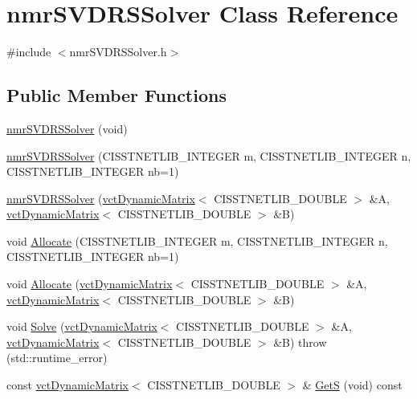\hypertarget{classnmr_s_v_d_r_s_solver}{}\section{nmr\+S\+V\+D\+R\+S\+Solver Class Reference}
\label{classnmr_s_v_d_r_s_solver}


{\ttfamily \#include $<$nmr\+S\+V\+D\+R\+S\+Solver.\+h$>$}

\subsection*{Public Member Functions}
\begin{DoxyCompactItemize}
\item 
\hyperlink{classnmr_s_v_d_r_s_solver_aac9d4a6d1ac1c09011a0bf0ff97c0b8c}{nmr\+S\+V\+D\+R\+S\+Solver} (void)
\item 
\hyperlink{classnmr_s_v_d_r_s_solver_a05c33d56231d75f6ea69f5925fa2d7c1}{nmr\+S\+V\+D\+R\+S\+Solver} (C\+I\+S\+S\+T\+N\+E\+T\+L\+I\+B\+\_\+\+I\+N\+T\+E\+G\+E\+R m, C\+I\+S\+S\+T\+N\+E\+T\+L\+I\+B\+\_\+\+I\+N\+T\+E\+G\+E\+R n, C\+I\+S\+S\+T\+N\+E\+T\+L\+I\+B\+\_\+\+I\+N\+T\+E\+G\+E\+R nb=1)
\item 
\hyperlink{classnmr_s_v_d_r_s_solver_a4d516e0148342bedf14257d387471549}{nmr\+S\+V\+D\+R\+S\+Solver} (\hyperlink{classvct_dynamic_matrix}{vct\+Dynamic\+Matrix}$<$ C\+I\+S\+S\+T\+N\+E\+T\+L\+I\+B\+\_\+\+D\+O\+U\+B\+L\+E $>$ \&A, \hyperlink{classvct_dynamic_matrix}{vct\+Dynamic\+Matrix}$<$ C\+I\+S\+S\+T\+N\+E\+T\+L\+I\+B\+\_\+\+D\+O\+U\+B\+L\+E $>$ \&B)
\item 
void \hyperlink{classnmr_s_v_d_r_s_solver_a785dd6169cf2bdb1ca35003b02753681}{Allocate} (C\+I\+S\+S\+T\+N\+E\+T\+L\+I\+B\+\_\+\+I\+N\+T\+E\+G\+E\+R m, C\+I\+S\+S\+T\+N\+E\+T\+L\+I\+B\+\_\+\+I\+N\+T\+E\+G\+E\+R n, C\+I\+S\+S\+T\+N\+E\+T\+L\+I\+B\+\_\+\+I\+N\+T\+E\+G\+E\+R nb=1)
\item 
void \hyperlink{classnmr_s_v_d_r_s_solver_aaf9330da718164c54098ff3a85cf94c8}{Allocate} (\hyperlink{classvct_dynamic_matrix}{vct\+Dynamic\+Matrix}$<$ C\+I\+S\+S\+T\+N\+E\+T\+L\+I\+B\+\_\+\+D\+O\+U\+B\+L\+E $>$ \&A, \hyperlink{classvct_dynamic_matrix}{vct\+Dynamic\+Matrix}$<$ C\+I\+S\+S\+T\+N\+E\+T\+L\+I\+B\+\_\+\+D\+O\+U\+B\+L\+E $>$ \&B)
\item 
void \hyperlink{classnmr_s_v_d_r_s_solver_a95c067eb756407a8b50cd0297c6a8395}{Solve} (\hyperlink{classvct_dynamic_matrix}{vct\+Dynamic\+Matrix}$<$ C\+I\+S\+S\+T\+N\+E\+T\+L\+I\+B\+\_\+\+D\+O\+U\+B\+L\+E $>$ \&A, \hyperlink{classvct_dynamic_matrix}{vct\+Dynamic\+Matrix}$<$ C\+I\+S\+S\+T\+N\+E\+T\+L\+I\+B\+\_\+\+D\+O\+U\+B\+L\+E $>$ \&B)  throw (std\+::runtime\+\_\+error)
\item 
const \hyperlink{classvct_dynamic_matrix}{vct\+Dynamic\+Matrix}$<$ C\+I\+S\+S\+T\+N\+E\+T\+L\+I\+B\+\_\+\+D\+O\+U\+B\+L\+E $>$ \& \hyperlink{classnmr_s_v_d_r_s_solver_ac73c09c7becbece05b4d1e1230b5049f}{Get\+S} (void) const 
\end{DoxyCompactItemize}
